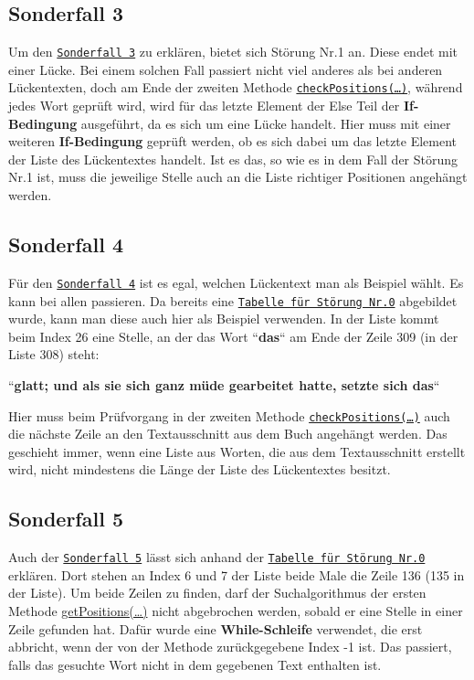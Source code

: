 \documentclass[a4paper, 10pt, ngerman]{scrartcl}
\begin{document}
\subsection{Sonderfall 3}\label{sec:dritterSonderfall}
Um den \hyperref[sonderfallDrei]{\texttt{Sonderfall 3}} zu erklären,
bietet sich Störung Nr.1 an.
Diese endet mit einer Lücke.
Bei einem solchen Fall passiert nicht viel anderes als bei anderen Lückentexten,
doch am Ende der zweiten Methode \hyperref[sec:checkPositions()]{\texttt{checkPositions(\ldots)}},
während jedes Wort geprüft wird,
wird für das letzte Element der Else Teil der \textbf{If-Bedingung} ausgeführt,
da es sich um eine Lücke handelt.
Hier muss mit einer weiteren \textbf{If-Bedingung} geprüft werden,
ob es sich dabei um das letzte Element der Liste des Lückentextes handelt.
Ist es das,
so wie es in dem Fall der Störung Nr.1 ist,
muss die jeweilige Stelle auch an die Liste richtiger Positionen angehängt werden.

\subsection{Sonderfall 4}\label{sec:vierterSonderfall}
Für den \hyperref[sonderfallVier]{\texttt{Sonderfall 4}} ist es egal,
welchen Lückentext man als Beispiel wählt.
Es kann bei allen passieren.
Da bereits eine \hyperref[tab:listeStoerung0]{\texttt{Tabelle für Störung Nr.0}} abgebildet wurde,
kann man diese auch hier als Beispiel verwenden.
In der Liste kommt beim Index 26 eine Stelle,
an der das Wort ``\textbf{das}`` am Ende der Zeile 309
(in der Liste 308)
steht:

``\textbf{glatt; und als sie sich ganz müde gearbeitet hatte, setzte sich das}``

Hier muss beim Prüfvorgang in der zweiten Methode \hyperref[sec:checkPositions()]{\texttt{checkPositions(\ldots)}} auch die nächste Zeile an den Textausschnitt aus dem Buch angehängt werden.
Das geschieht immer,
wenn eine Liste aus Worten,
die aus dem Textausschnitt erstellt wird,
nicht mindestens die Länge der Liste des Lückentextes besitzt.

\subsection{Sonderfall 5}\label{sec:fuenfterSonderfall}
Auch der \hyperref[sonderfallFuenf]{\texttt{Sonderfall 5}} lässt sich anhand der \hyperref[tab:listeStoerung0]{\texttt{Tabelle für Störung Nr.0}} erklären.
Dort stehen an Index 6 und 7 der Liste beide Male die Zeile 136 (135 in der Liste).
Um beide Zeilen zu finden,
darf der Suchalgorithmus der ersten Methode \hyperref[sec:getPosition()]{getPositions(\ldots)} nicht abgebrochen werden,
sobald er eine Stelle in einer Zeile gefunden hat.
Dafür wurde eine \textbf{While-Schleife} verwendet,
die erst abbricht,
wenn der von der Methode zurückgegebene Index -1 ist.
Das passiert,
falls das gesuchte Wort nicht in dem gegebenen Text enthalten ist.
\end{document}
